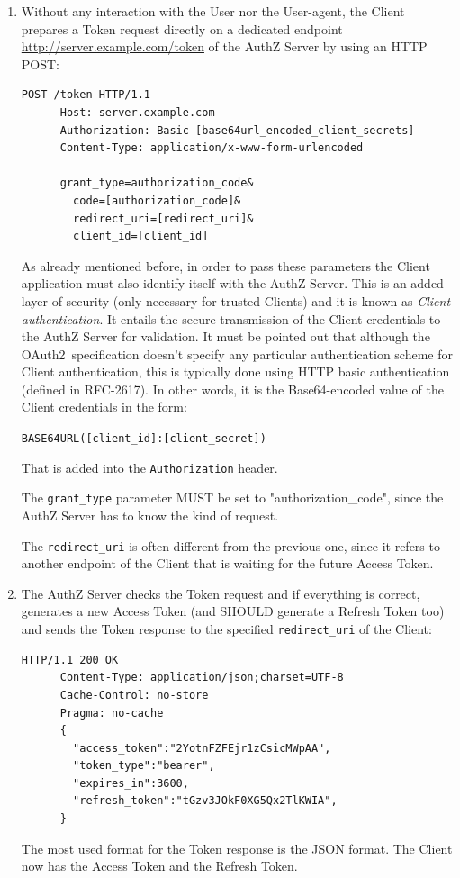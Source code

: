 \documentclass[a4paper,12pt]{article}
\def\oauth{OAuth2\xspace}
\def\rfc#1{RFC-#1\xspace}
\begin{document}
\begin{enumerate}
    \item Without any interaction with the User nor the User-agent, the Client prepares a Token request directly on a dedicated endpoint \url{http://server.example.com/token} of the AuthZ Server by using an HTTP POST:
    
    \begin{lstlisting}[basicstyle=\ttfamily]
      POST /token HTTP/1.1
      Host: server.example.com
      Authorization: Basic [base64url_encoded_client_secrets]
      Content-Type: application/x-www-form-urlencoded
    
      grant_type=authorization_code&
        code=[authorization_code]&
        redirect_uri=[redirect_uri]&
        client_id=[client_id]
    \end{lstlisting}
    
    As already mentioned before, in order to pass these parameters the Client application must also identify itself with the AuthZ Server. This is an added layer of security (only necessary for trusted Clients) and it is known as \textit{Client
    authentication}. It entails the secure transmission of the Client credentials to the AuthZ Server for validation. It must be pointed out that although the \oauth\ specification doesn't specify any particular authentication scheme for Client authentication, this is typically done using HTTP basic authentication (defined in \rfc{2617}).
    In other words, it is the Base64-encoded value of the Client credentials in
    the form:

    \quad \texttt{BASE64URL([client\_id]:[client\_secret])} 
    
    That is added into the \texttt{Authorization} header.
    
    The \texttt{grant\_type} parameter MUST be set to "authorization\_code", since the AuthZ Server has to know the kind of request.
    
    The \texttt{redirect\_uri} is often different from the previous one, since it refers to another endpoint of the Client that is waiting for the future Access Token.
    
    \item The AuthZ Server checks the Token request and if everything is correct, generates a new Access Token (and SHOULD generate a Refresh Token too) and sends the Token response to the specified \texttt{redirect\_uri} of the Client:
    
    \begin{lstlisting}[basicstyle=\ttfamily]
      HTTP/1.1 200 OK
      Content-Type: application/json;charset=UTF-8
      Cache-Control: no-store
      Pragma: no-cache
      {
        "access_token":"2YotnFZFEjr1zCsicMWpAA",
        "token_type":"bearer",
        "expires_in":3600,
        "refresh_token":"tGzv3JOkF0XG5Qx2TlKWIA",
      }
    \end{lstlisting}    
    
    The most used format for the Token response is the JSON format. The Client now has the Access Token and the Refresh Token.
    
\end{enumerate}
\end{document}
